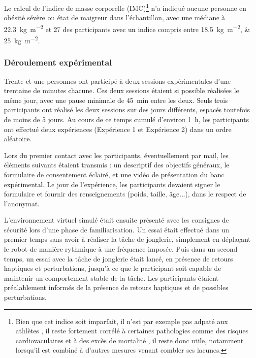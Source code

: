 Le calcul de l'indice de masse corporelle (IMC)\footnote{Bien que cet indice soit imparfait, il n'est par exemple pas adpaté aux athlètes \parencite{provencher_body_2018}, il reste fortement corrélé à certaines pathologies comme des risques cardiovaculaires \parencite{steinberger_comparison_2005} et à des excès de mortalité \parencite{flegal_estimates_2009}, il reste donc utile, notamment lorsqu'il est combiné à d'autres mesures venant combler ses lacunes.} n'a indiqué aucune personne en obésité sévère ou état de maigreur dans l'échantillon, avec une médiane à \SI{22.3}{\kilogram\per\meter\squared} et 27 des participants avec un indice compris entre \SIlist{18.5;25}{\kilogram\per\meter\squared}.

\subsubsection{Déroulement expérimental} \label{chap4_sec_exp_sub_prot_3}

Trente et une personnes ont participé à deux sessions expérimentales d’une trentaine de minutes chacune. Ces deux sessions étaient si possible réalisées le même jour, avec une pause minimale de \SI{45}{\minute} entre les deux. Seuls trois participants ont réalisé les deux sessions sur des jours différents, espacés toutefois de moins de 5 jours. Au cours de ce temps cumulé d’environ \SI{1}{\hour}, les participants ont effectué deux expériences (Expérience 1 et Expérience 2) dans un ordre aléatoire.

Lors du premier contact avec les participants, éventuellement par mail, les éléments suivants étaient transmis : un descriptif des objectifs généraux, le formulaire de consentement éclairé, et une vidéo de présentation du banc expérimental. Le jour de l’expérience, les participants devaient signer le formulaire et fournir des renseignements (poids, taille, âge...), dans le respect de l’anonymat.

L'environnement virtuel simulé était ensuite présenté avec les consignes de sécurité lors d'une phase de familiarisation. Un essai était effectué dans un premier temps sans avoir à réaliser la tâche de jonglerie, simplement en déplaçant le robot de manière rythmique à une fréquence imposée. Puis dans un second temps, un essai avec la tâche de jonglerie était lancé, en présence de retours haptiques et perturbations, jusqu'à ce que le participant soit capable de maintenir un comportement stable de la tâche. Les participants étaient préalablement informés de la présence de retours haptiques et de possibles perturbations.

